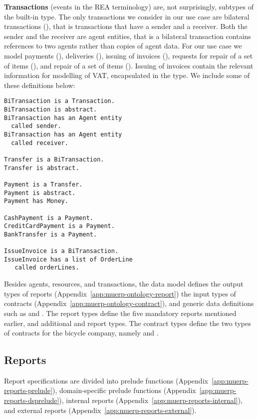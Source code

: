\noindent\textbf{Transactions} (events in the REA terminology)
are, not surprisingly, subtypes of the built-in
 type. The only transactions we consider in
our use case are bilateral transactions (),
that is transactions that have a sender and a receiver. Both the
sender and the receiver are agent entities, that is a bilateral
transaction contains references to two agents rather than copies of
agent data. For our use case we model payments (),
deliveries (), issuing of invoices
(), requests for repair of a set of items
(), and repair of a set of items
(). Issuing of invoices contain the relevant
information for modelling of VAT, encapsulated in the
 type. We include some of these definitions
below:
\begin{lstlisting}[language=ontology,basicstyle=\small,multicols=2]
BiTransaction is a Transaction.
BiTransaction is abstract.
BiTransaction has an Agent entity
  called sender.
BiTransaction has an Agent entity
  called receiver.

Transfer is a BiTransaction.
Transfer is abstract.

Payment is a Transfer.
Payment is abstract.
Payment has Money.

CashPayment is a Payment.
CreditCardPayment is a Payment.
BankTransfer is a Payment.

IssueInvoice is a BiTransaction.
IssueInvoice has a list of OrderLine
   called orderLines.
\end{lstlisting}

Besides agents, resources, and transactions, the data model defines
the output types of reports (Appendix~\ref{app:muerp-ontology-report})
the input types of contracts
(Appendix~\ref{app:muerp-ontology-contract}), and generic data
definitions such as  and .
 The report types define
the five mandatory reports mentioned earlier, and additional
 and  report
types. The contract types define the two types of contracts for the
bicycle company, namely  and .

\subsection{Reports}

Report specifications are divided into prelude functions
(Appendix~\ref{app:muerp-reports-prelude}), domain-specific prelude
functions (Appendix~\ref{app:muerp-reports-dsprelude}), internal
reports (Appendix~\ref{app:muerp-reports-internal}), and external
reports (Appendix~\ref{app:muerp-reports-external}).

